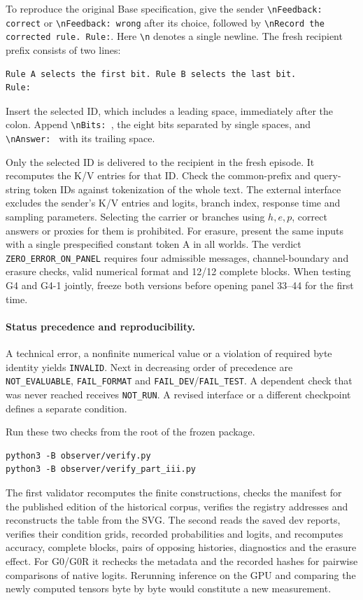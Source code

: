 To reproduce the original Base specification, give the sender \verb!\nFeedback: correct! or \verb!\nFeedback: wrong! after its choice, followed by \verb!\nRecord the corrected rule. Rule:!. Here \verb!\n! denotes a single newline. The fresh recipient prefix consists of two lines:
\begin{verbatim}
Rule A selects the first bit. Rule B selects the last bit.
Rule:
\end{verbatim}
Insert the selected ID, which includes a leading space, immediately after the colon. Append \verb!\nBits: !, the eight bits separated by single spaces, and \verb!\nAnswer: ! with its trailing space.

Only the selected ID is delivered to the recipient in the fresh episode. It recomputes the K/V entries for that ID. Check the common-prefix and query-string token IDs against tokenization of the whole text. The external interface excludes the sender's K/V entries and logits, branch index, response time and sampling parameters. Selecting the carrier or branches using $h,e,p$, correct answers or proxies for them is prohibited. For erasure, present the same inputs with a single prespecified constant token A in all worlds. The verdict \texttt{ZERO\_ERROR\_ON\_PANEL} requires four admissible messages, channel-boundary and erasure checks, valid numerical format and 12/12 complete blocks. When testing G4 and G4-1 jointly, freeze both versions before opening panel 33--44 for the first time.

\paragraph{Status precedence and reproducibility.}
A technical error, a nonfinite numerical value or a violation of required byte identity yields \texttt{INVALID}. Next in decreasing order of precedence are \texttt{NOT\_EVALUABLE}, \texttt{FAIL\_FORMAT} and \texttt{FAIL\_DEV}/\texttt{FAIL\_TEST}. A dependent check that was never reached receives \texttt{NOT\_RUN}. A revised interface or a different checkpoint defines a separate condition.

\noindent\begin{minipage}{\linewidth}
Run these two checks from the root of the frozen package.
\begin{verbatim}
python3 -B observer/verify.py
python3 -B observer/verify_part_iii.py
\end{verbatim}
\end{minipage}\par
The first validator recomputes the finite constructions, checks the manifest for the published edition of the historical corpus, verifies the registry addresses and reconstructs the table from the SVG. The second reads the saved dev reports, verifies their condition grids, recorded probabilities and logits, and recomputes accuracy, complete blocks, pairs of opposing histories, diagnostics and the erasure effect. For G0/G0R it rechecks the metadata and the recorded hashes for pairwise comparisons of native logits. Rerunning inference on the GPU and comparing the newly computed tensors byte by byte would constitute a new measurement.
